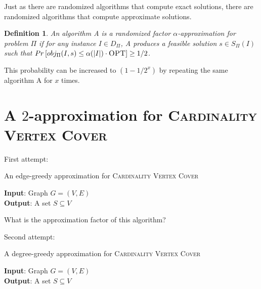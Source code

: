 \documentclass[twoside]{article}
\newtheorem{definition}{Definition}
\newcommand{\OPT}{\mbox{\sc OPT}}
\renewcommand{\Pr}[1]{\ensuremath{Pr\left[#1\right]}}
\begin{document}
Just as there are randomized algorithms that compute exact solutions, there are randomized algorithms that compute approximate solutions.

\begin{definition} An algorithm A is a randomized factor $\alpha$-approximation for problem $\Pi$ if for any instance $I \in D_\Pi$, A produces a feasible solution $s \in S_\Pi(I)$ such that $\Pr{obj_\Pi(I, s) \leq \alpha(|I|) \cdot \OPT} \geq 1/2$.
\end{definition}

This probability can be increased to $(1 - 1/2^x)$ by repeating the same algorithm A for $x$ times.

\section{A $2$-approximation for \textsc{Cardinality Vertex Cover}}

First attempt:

\begin{algorithm}[H]
\caption{An edge-greedy approximation for \textsc{Cardinality Vertex Cover}}
{\bf Input}: Graph $G = (V, E)$ \\
{\bf Output}: A set $S \subseteq V$
\begin{algorithmic}\label{alg:edge_vc}
\ENDWHILE
{}
\end{algorithmic}
\end{algorithm}

What is the approximation factor of this algorithm?

Second attempt:

\begin{algorithm}[H]
\caption{A degree-greedy approximation for \textsc{Cardinality Vertex Cover}}
{\bf Input}: Graph $G = (V, E)$ \\
{\bf Output}: A set $S \subseteq V$
\begin{algorithmic}\label{alg:deg_vc}
\ENDWHILE
{}
\end{algorithmic}
\end{algorithm}
\end{document}
